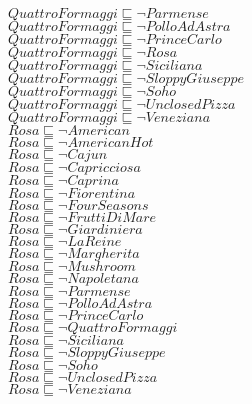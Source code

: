 \documentclass[a4paper,10pt]{article}
\begin{document}
 $QuattroFormaggi \sqsubseteq  \lnot Parmense$\\ 
 $QuattroFormaggi \sqsubseteq  \lnot PolloAdAstra$\\ 
 $QuattroFormaggi \sqsubseteq  \lnot PrinceCarlo$\\ 
 $QuattroFormaggi \sqsubseteq  \lnot Rosa$\\ 
 $QuattroFormaggi \sqsubseteq  \lnot Siciliana$\\ 
 $QuattroFormaggi \sqsubseteq  \lnot SloppyGiuseppe$\\ 
 $QuattroFormaggi \sqsubseteq  \lnot Soho$\\ 
 $QuattroFormaggi \sqsubseteq  \lnot UnclosedPizza$\\ 
 $QuattroFormaggi \sqsubseteq  \lnot Veneziana$\\ 
 $Rosa \sqsubseteq  \lnot American$\\ 
 $Rosa \sqsubseteq  \lnot AmericanHot$\\ 
 $Rosa \sqsubseteq  \lnot Cajun$\\ 
 $Rosa \sqsubseteq  \lnot Capricciosa$\\ 
 $Rosa \sqsubseteq  \lnot Caprina$\\ 
 $Rosa \sqsubseteq  \lnot Fiorentina$\\ 
 $Rosa \sqsubseteq  \lnot FourSeasons$\\ 
 $Rosa \sqsubseteq  \lnot FruttiDiMare$\\ 
 $Rosa \sqsubseteq  \lnot Giardiniera$\\ 
 $Rosa \sqsubseteq  \lnot LaReine$\\ 
 $Rosa \sqsubseteq  \lnot Margherita$\\ 
 $Rosa \sqsubseteq  \lnot Mushroom$\\ 
 $Rosa \sqsubseteq  \lnot Napoletana$\\ 
 $Rosa \sqsubseteq  \lnot Parmense$\\ 
 $Rosa \sqsubseteq  \lnot PolloAdAstra$\\ 
 $Rosa \sqsubseteq  \lnot PrinceCarlo$\\ 
 $Rosa \sqsubseteq  \lnot QuattroFormaggi$\\ 
 $Rosa \sqsubseteq  \lnot Siciliana$\\ 
 $Rosa \sqsubseteq  \lnot SloppyGiuseppe$\\ 
 $Rosa \sqsubseteq  \lnot Soho$\\ 
 $Rosa \sqsubseteq  \lnot UnclosedPizza$\\ 
 $Rosa \sqsubseteq  \lnot Veneziana$\\ 
\end{document}
